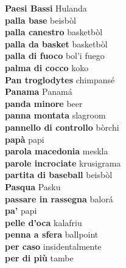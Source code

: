 \textbf{ Paesi Bassi  } Hulanda \\
\textbf{ palla base  } beisbòl \\
\textbf{ palla canestro  } basketbòl \\
\textbf{ palla da basket  } basketbòl \\
\textbf{ palla di fuoco  } bol’i fuego \\
\textbf{ palma di cocco  } koko \\
\textbf{ Pan troglodytes  } chimpansé \\
\textbf{ Panama  } Panamá \\
\textbf{ panda minore  } beer \\
\textbf{ panna montata  } slagroom \\
\textbf{ pannello di controllo  } bòrchi \\
\textbf{ papà  } papi \\
\textbf{ parola macedonia  } meskla \\
\textbf{ parole incrociate  } krusigrama \\
\textbf{ partita di baseball  } beisbòl \\
\textbf{ Pasqua  } Pasku \\
\textbf{ passare in rassegna  } balorá \\
\textbf{ pa’  } papi \\
\textbf{ pelle d’oca  } kalafriu \\
\textbf{ penna a sfera  } ballpoint \\
\textbf{ per caso  } insidentalmente \\
\textbf{ per di più  } tambe \\

